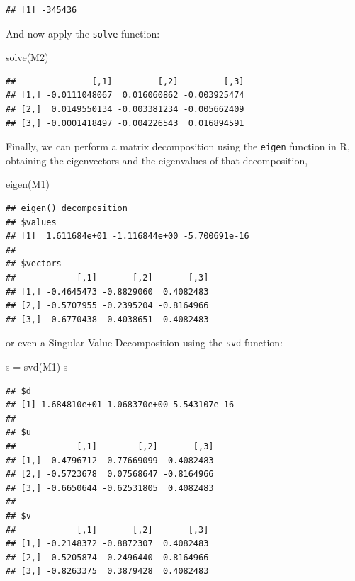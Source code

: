 \documentclass[
]{book}
\newenvironment{Shaded}{\begin{snugshade}}{\end{snugshade}}
\newcommand{\FunctionTok}[1]{\textcolor[rgb]{0.00,0.00,0.00}{#1}}
\newcommand{\NormalTok}[1]{#1}
\newcommand{\OtherTok}[1]{\textcolor[rgb]{0.56,0.35,0.01}{#1}}
\begin{document}
\begin{verbatim}
## [1] -345436
\end{verbatim}

And now apply the \texttt{solve} function:

\begin{Shaded}
\begin{Highlighting}[]
\FunctionTok{solve}\NormalTok{(M2)}
\end{Highlighting}
\end{Shaded}

\begin{verbatim}
##               [,1]         [,2]         [,3]
## [1,] -0.0111048067  0.016060862 -0.003925474
## [2,]  0.0149550134 -0.003381234 -0.005662409
## [3,] -0.0001418497 -0.004226543  0.016894591
\end{verbatim}

Finally, we can perform a matrix decomposition using the \texttt{eigen} function in R, obtaining the eigenvectors and the eigenvalues of that decomposition,

\begin{Shaded}
\begin{Highlighting}[]
\FunctionTok{eigen}\NormalTok{(M1)}
\end{Highlighting}
\end{Shaded}

\begin{verbatim}
## eigen() decomposition
## $values
## [1]  1.611684e+01 -1.116844e+00 -5.700691e-16
## 
## $vectors
##            [,1]       [,2]       [,3]
## [1,] -0.4645473 -0.8829060  0.4082483
## [2,] -0.5707955 -0.2395204 -0.8164966
## [3,] -0.6770438  0.4038651  0.4082483
\end{verbatim}

or even a Singular Value Decomposition using the \texttt{svd} function:

\begin{Shaded}
\begin{Highlighting}[]
\NormalTok{s }\OtherTok{=} \FunctionTok{svd}\NormalTok{(M1)}
\NormalTok{s}
\end{Highlighting}
\end{Shaded}

\begin{verbatim}
## $d
## [1] 1.684810e+01 1.068370e+00 5.543107e-16
## 
## $u
##            [,1]        [,2]       [,3]
## [1,] -0.4796712  0.77669099  0.4082483
## [2,] -0.5723678  0.07568647 -0.8164966
## [3,] -0.6650644 -0.62531805  0.4082483
## 
## $v
##            [,1]       [,2]       [,3]
## [1,] -0.2148372 -0.8872307  0.4082483
## [2,] -0.5205874 -0.2496440 -0.8164966
## [3,] -0.8263375  0.3879428  0.4082483
\end{verbatim}
\end{document}
